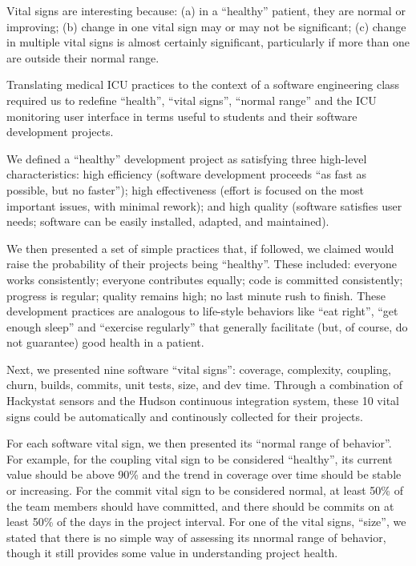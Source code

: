 \documentclass{acm_proc_article-sp}
\begin{document}
Vital signs are interesting because: (a) in a ``healthy'' patient, they are
normal or improving; (b) change in one vital sign may or may not be
significant; (c) change in multiple vital signs is almost certainly
significant, particularly if more than one are outside their normal range.

Translating medical ICU practices to the context of a software engineering
class required us to redefine ``health'', ``vital signs'', ``normal range''
and the ICU monitoring user interface in terms useful to students and their
software development projects.

We defined a ``healthy'' development project as satisfying three high-level
characteristics: high efficiency (software development proceeds ``as fast
as possible, but no faster''); high effectiveness (effort is focused on the
most important issues, with minimal rework); and high quality (software
satisfies user needs; software can be easily installed, adapted, and
maintained).

We then presented a set of simple practices that, if followed, we claimed
would raise the probability of their projects being ``healthy''.  These
included: everyone works consistently; everyone contributes equally; code
is committed consistently; progress is regular; quality remains high; no
last minute rush to finish.  These development practices are analogous to
life-style behaviors like ``eat right'', ``get enough sleep'' and
``exercise regularly'' that generally facilitate (but, of course, do not
guarantee) good health in a patient.

Next, we presented nine software ``vital signs'': coverage, complexity,
coupling, churn, builds, commits, unit tests, size, and dev
time. Through a combination of Hackystat sensors and the Hudson continuous
integration system, these 10 vital signs could be automatically and
continously collected for their projects.

For each software vital sign, we then presented its ``normal range of
behavior''.  For example, for the coupling vital sign to be considered
``healthy'', its current value should be above 90\% and the trend in
coverage over time should be stable or increasing.  For the commit vital
sign to be considered normal, at least 50\% of the team members should have
committed, and there should be commits on at least 50\% of the days in the
project interval.  For one of the vital signs, ``size'', we stated that
there is no simple way of assessing its nnormal range of behavior, though
it still provides some value in understanding project health.
\end{document}
